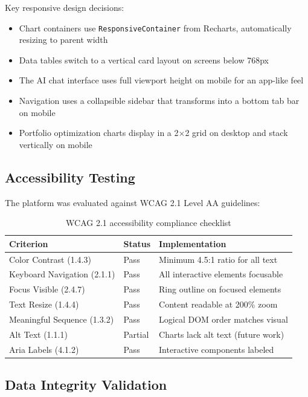 \documentclass[12pt, a4paper, oneside]{report}
\begin{document}
Key responsive design decisions:
\begin{itemize}[nosep]
    \item Chart containers use \texttt{ResponsiveContainer} from Recharts, automatically resizing to parent width
    \item Data tables switch to a vertical card layout on screens below 768px
    \item The AI chat interface uses full viewport height on mobile for an app-like feel
    \item Navigation uses a collapsible sidebar that transforms into a bottom tab bar on mobile
    \item Portfolio optimization charts display in a 2$\times$2 grid on desktop and stack vertically on mobile
\end{itemize}

\subsection{Accessibility Testing}

The platform was evaluated against WCAG 2.1 Level AA guidelines:

\begin{table}[H]
\centering
\caption{WCAG 2.1 accessibility compliance checklist}
\label{tab:accessibility}
\begin{tabularx}{\textwidth}{@{}l l X@{}}
\toprule
\textbf{Criterion} & \textbf{Status} & \textbf{Implementation} \\
\midrule
Color Contrast (1.4.3) & Pass & Minimum 4.5:1 ratio for all text \\
Keyboard Navigation (2.1.1) & Pass & All interactive elements focusable \\
Focus Visible (2.4.7) & Pass & Ring outline on focused elements \\
Text Resize (1.4.4) & Pass & Content readable at 200\% zoom \\
Meaningful Sequence (1.3.2) & Pass & Logical DOM order matches visual \\
Alt Text (1.1.1) & Partial & Charts lack alt text (future work) \\
Aria Labels (4.1.2) & Pass & Interactive components labeled \\
\bottomrule
\end{tabularx}
\end{table}

\subsection{Data Integrity Validation}
\end{document}

